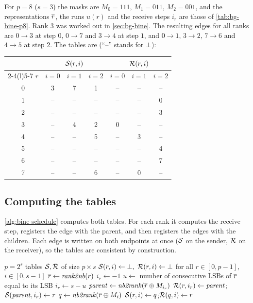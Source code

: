For $p=8$ ($s=3$) the masks are $M_0=111$, $M_1=011$, $M_2=001$, and the representations $\overline{r}$, the runs $u(r)$ and the receive steps $i_r$ are those of \cref{tab:bg-bine-p8}.
Rank $3$ was worked out in \cref{sec:bg-bine}. The resulting edges for all ranks are $0\to3$ at step $0$, $0\to7$ and $3\to4$ at step $1$, and $0\to1$, $3\to2$, $7\to6$ and $4\to5$ at step $2$.
The tables are (``--'' stands for $\bot$):
\begin{center}
\begin{tabular}{@{}c ccc @{\qquad} ccc@{}}
\toprule
 & \multicolumn{3}{c}{$\mathcal{S}(r,i)$} & \multicolumn{3}{c}{$\mathcal{R}(r,i)$} \\
\cmidrule(lr){2-4}\cmidrule(l){5-7}
$r$ & $i{=}0$ & $i{=}1$ & $i{=}2$ & $i{=}0$ & $i{=}1$ & $i{=}2$ \\
\midrule
0 & 3  & 7  & 1  & -- & -- & -- \\
1 & -- & -- & -- & -- & -- & 0  \\
2 & -- & -- & -- & -- & -- & 3  \\
3 & -- & 4  & 2  & 0  & -- & -- \\
4 & -- & -- & 5  & -- & 3  & -- \\
5 & -- & -- & -- & -- & -- & 4  \\
6 & -- & -- & -- & -- & -- & 7  \\
7 & -- & -- & 6  & -- & 0  & -- \\
\bottomrule
\end{tabular}
\end{center}

\subsection{Computing the tables}

\cref{alg:bine-schedule} computes both tables.
For each rank it computes the receive step, registers the edge with the parent, and then registers the edges with the children.
Each edge is written on both endpoints at once ($\mathcal{S}$ on the sender, $\mathcal{R}$ on the receiver), so the tables are consistent by construction.

\begin{algorithm}[H]
\caption{Schedule of the \bine{} tree rooted at rank $0$ ($p=2^s$).}
\label{alg:bine-schedule}
\begin{algorithmic}[1]
\Require $p=2^s$
\Ensure tables $\mathcal{S},\mathcal{R}$ of size $p\times s$
\State $\Send(r,i)\gets\none,\ \Recv(r,i)\gets\none$ for all $r\in[0,p-1]$, $i\in[0,s-1]$
  \State $\overline{r}\gets \mathit{rank2nb}(r)$
    \State $i_r\gets -1$ 
  \Else
    \State $u\gets$ number of consecutive LSBs of $\overline{r}$ equal to its LSB
    \State $i_r\gets s-u$ 
    \State $\mathit{parent}\gets \mathit{nb2rank}(\overline{r}\oplus M_{i_r})$
    \State $\mathcal{R}(r,i_r)\gets \mathit{parent}$;\quad $\mathcal{S}(\mathit{parent},i_r)\gets r$
  \EndIf
    \State $q\gets \mathit{nb2rank}(\overline{r}\oplus M_i)$ 
    \State $\mathcal{S}(r,i)\gets q$;\quad $\mathcal{R}(q,i)\gets r$
  \EndFor
\EndFor
\end{algorithmic}
\end{algorithm}

